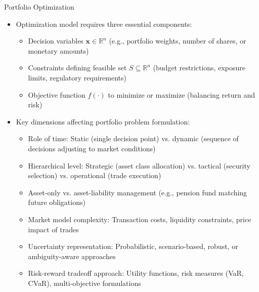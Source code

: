 \documentclass[10pt]{beamer}
\begin{document}
\begin{frame}{Portfolio Optimization}
  \begin{itemize}[<+->]
    \item Optimization model requires three essential components:
      \begin{itemize}
        \item Decision variables $\mathbf{x} \in \mathbb{R}^n$ (e.g., portfolio weights, number of shares, or monetary amounts)
        \item Constraints defining feasible set $S \subseteq \mathbb{R}^n$ (budget restrictions, exposure limits, regulatory requirements)
        \item Objective function $f(\cdot)$ to minimize or maximize (balancing return and risk)
      \end{itemize}
    \item Key dimensions affecting portfolio problem formulation:
      \begin{itemize}
        \item Role of time: Static (single decision point) vs. dynamic (sequence of decisions adjusting to market conditions)
        \item Hierarchical level: Strategic (asset class allocation) vs. tactical (security selection) vs. operational (trade execution)
        \item Asset-only vs. asset-liability management (e.g., pension fund matching future obligations)
        \item Market model complexity: Transaction costs, liquidity constraints, price impact of trades
        \item Uncertainty representation: Probabilistic, scenario-based, robust, or ambiguity-aware approaches
        \item Risk-reward tradeoff approach: Utility functions, risk measures (VaR, CVaR), multi-objective formulations
      \end{itemize}
  \end{itemize}
\end{frame}
\end{document}
